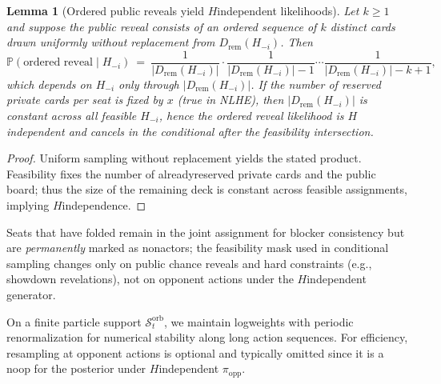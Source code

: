 \documentclass[10pt]{article}
\newcommand{\1}{\mathbf{1}}
\theoremstyle{plain}
\newtheorem{lemma}{Lemma}
\begin{document}
\begin{lemma}[Ordered public reveals yield $H$\textendash independent likelihoods]
\label{lem:ordered_reveal}
Let $k\ge 1$ and suppose the public reveal consists of an ordered sequence of $k$ distinct cards drawn uniformly without replacement from $D_{\mathrm{rem}}(H_{-i})$. Then
\[
\mathbb{P}(\text{ordered reveal}\mid H_{-i})\ =\ \frac{1}{|D_{\mathrm{rem}}(H_{-i})|}\cdot \frac{1}{|D_{\mathrm{rem}}(H_{-i})|-1}\cdots \frac{1}{|D_{\mathrm{rem}}(H_{-i})|-k+1},
\]
which depends on $H_{-i}$ only through $|D_{\mathrm{rem}}(H_{-i})|$. If the number of reserved private cards per seat is fixed by $x$ (true in NLHE), then $|D_{\mathrm{rem}}(H_{-i})|$ is constant across all feasible $H_{-i}$, hence the ordered reveal likelihood is $H$\textendash independent and cancels in the conditional after the feasibility intersection.
\end{lemma}
\begin{proof}
Uniform sampling without replacement yields the stated product. Feasibility fixes the number of already\textendash reserved private cards and the public board; thus the size of the remaining deck is constant across feasible assignments, implying $H$\textendash independence.
\end{proof}

Seats that have folded remain in the joint assignment for blocker consistency but are \emph{permanently} marked as non\textendash actors; the feasibility mask used in conditional sampling changes only on public chance reveals and hard constraints (e.g., showdown revelations), not on opponent actions under the $H$\textendash independent generator.

On a finite particle support $\mathcal{S}_t^{\text{orb}}$, we maintain log\textendash weights with periodic renormalization for numerical stability along long action sequences. For efficiency, resampling at opponent actions is optional and typically omitted since it is a no\textendash op for the posterior under $H$\textendash independent $\pi_{\mathrm{opp}}$.
\end{document}
